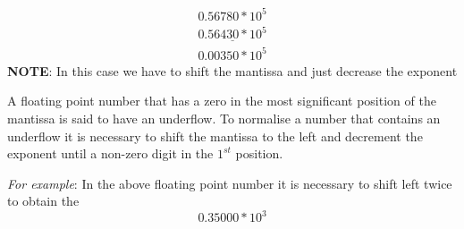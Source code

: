 \documentclass[11pt, a4paper, oneside]{book}
\begin{document}
                \begin{equation*}
                  \begin{matrix}
                    0.56780*10^5 \\
                    \underline{0.56430*10^5} \\
                    0.00350*10^5
                  \end{matrix}
                \end{equation*}
                \textbf{NOTE}: In this case we have to shift the mantissa and just decrease the exponent

                A floating point number that has a zero in the most significant position of the mantissa is said to have an underflow. To normalise a number that contains an underflow it is necessary to shift the mantissa to the left and decrement the exponent until a non-zero digit in the $1^{st}$ position.

                \textit{For example}: In the above floating point number it is necessary to shift left twice to obtain the
                \begin{equation*}
                  0.35000*10^3
                \end{equation*}
\end{document}
